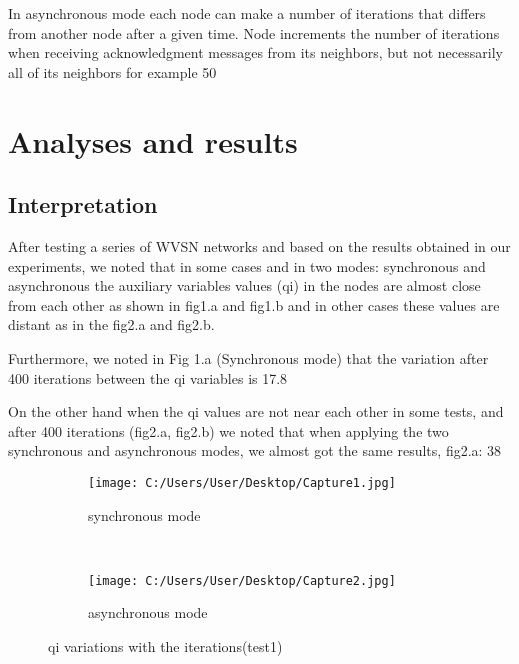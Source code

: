 \documentclass[12pt,a4]{article}
\begin{document}
\hspace{0.6cm}In asynchronous mode each node can make a number of iterations that differs from another node after a given time.  Node increments the number of iterations when receiving acknowledgment messages from its neighbors, but not necessarily all of its neighbors for example 50%

\section{Analyses and results}
\subsection{Interpretation}

\hspace{0.6cm}After testing a series of WVSN networks and based on the results obtained in our experiments, we noted that in some cases and in two modes: synchronous and asynchronous the auxiliary variables values (qi) in the nodes are almost close from each other as shown in fig1.a and fig1.b and in other cases these values are distant as in the fig2.a and fig2.b.

Furthermore, we noted in Fig 1.a (Synchronous mode) that the variation after 400 iterations between the qi variables is 17.8%

On the other hand when the qi values are not near each other in some tests, and after 400 iterations (fig2.a, fig2.b) we noted that when applying the two synchronous and asynchronous modes, we almost got the same results, fig2.a: 38%
\vspace{0.8cm}
\begin{figure}[ht]
\centering
	\begin{center}
	     \begin{subfigure}[normla]{0.4\textwidth}
		\texttt{[image: C:/Users/User/Desktop/Capture1.jpg]}
		\caption{synchronous mode}
	    \end{subfigure}
\hspace{0.8cm}
	~
	    \begin{subfigure}[normla]{0.4\textwidth}
		\texttt{[image: C:/Users/User/Desktop/Capture2.jpg]}
		\caption{asynchronous mode}
	    \end{subfigure}
	\end{center}
\caption{qi variations with the iterations(test1) }
\end{figure}
\end{document}
